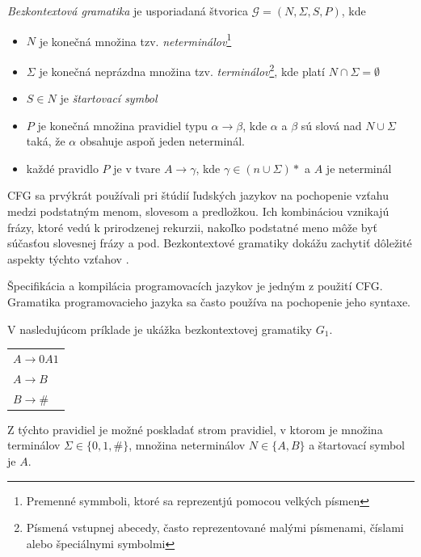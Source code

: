 \begin{definice}
\textit{Bezkontextová gramatika} je usporiadaná štvorica $\mathcal{G} = (N, \Sigma , S, P)$, kde
\begin{itemize}
\item $N$ je konečná množina tzv. \textit{neterminálov}\footnote{Premenné symmboli, ktoré sa reprezentjú pomocou velkých písmen}
\item $\Sigma$ je konečná neprázdna množina tzv. \textit{terminálov}\footnote{Písmená vstupnej abecedy, často reprezentované malými písmenami, číslami alebo špeciálnymi symbolmi}, kde platí $N \cap \Sigma = \emptyset$
\item $S \in N$ je \textit{štartovací symbol}
\item $P$ je konečná množina pravidiel typu $\alpha \rightarrow \beta$, kde $\alpha$ a $\beta$ sú slová nad $N \cup \Sigma$ taká, že $\alpha$ obsahuje aspoň jeden neterminál. 
\item každé pravidlo $P$ je v tvare $A \rightarrow \gamma$, kde $\gamma \in (n \cup \Sigma)*$ a $A$ je neterminál \cite{demlova:gramatiky}
\end{itemize}
\end{definice}

CFG sa prvýkrát používali pri štúdií ľudských jazykov na pochopenie vzťahu medzi podstatným menom, slovesom a predložkou. Ich kombináciou vznikajú frázy, ktoré vedú k prirodzenej rekurzii, nakoľko podstatné meno môže byť súčasťou slovesnej frázy a pod. Bezkontextové gramatiky dokážu zachytiť dôležité aspekty týchto vzťahov \cite{computation_theory}.

Špecifikácia a kompilácia programovacích jazykov je jedným z použití CFG. Gramatika programovacieho jazyka sa často používa na pochopenie jeho syntaxe.

V nasledujúcom príklade je ukážka bezkontextovej gramatiky $G_1$.
\begin{center}
\begin{tabular}{p{}}
$A \rightarrow 0A1$\\
$A \rightarrow B$\\
$B \rightarrow $\#
\end{tabular}
\end{center}

Z týchto pravidiel je možné poskladať strom pravidiel, v ktorom je množina terminálov $\Sigma \in \{0,1,\#\}$, množina neterminálov $N \in \{A, B\}$ a štartovací symbol je $A$. 

